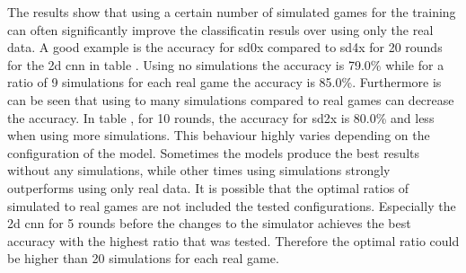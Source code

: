 

The results show that using a certain number of simulated games for the training can often significantly improve the classificatin resuls over using only the real data. A good example is the accuracy for sd0x compared to sd4x for 20 rounds for the 2d cnn in table . Using no simulations the accuracy is 79.0\% while for a ratio of 9 simulations for each real game the accuracy is 85.0\%. Furthermore is can be seen that using to many simulations compared to real games can decrease the accuracy. In table , for 10 rounds, the accuracy for sd2x is 80.0\% and less when using more simulations. This behaviour highly varies depending on the configuration of the model. Sometimes the models produce the best results without any simulations, while other times using simulations strongly outperforms using only real data. It is possible that the optimal ratios of simulated to real games are not included the tested configurations. Especially the 2d cnn for 5 rounds before the changes to the simulator achieves the best accuracy with the highest ratio that was tested. Therefore the optimal ratio could be higher than 20 simulations for each real game. 

